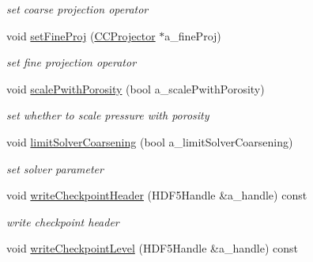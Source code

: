 \begin{DoxyCompactItemize}
\begin{DoxyCompactList}\small\item\em set coarse projection operator \end{DoxyCompactList}\item 
\hypertarget{class_c_c_projector_ab0bbf1c37684fb885be17880899f2a68}{void \hyperlink{class_c_c_projector_ab0bbf1c37684fb885be17880899f2a68}{set\-Fine\-Proj} (\hyperlink{class_c_c_projector}{C\-C\-Projector} $\ast$a\-\_\-fine\-Proj)}\label{class_c_c_projector_ab0bbf1c37684fb885be17880899f2a68}

\begin{DoxyCompactList}\small\item\em set fine projection operator \end{DoxyCompactList}\item 
\hypertarget{class_c_c_projector_ad14f70084789b918a9e4da699e1499db}{void \hyperlink{class_c_c_projector_ad14f70084789b918a9e4da699e1499db}{scale\-Pwith\-Porosity} (bool a\-\_\-scale\-Pwith\-Porosity)}\label{class_c_c_projector_ad14f70084789b918a9e4da699e1499db}

\begin{DoxyCompactList}\small\item\em set whether to scale pressure with porosity \end{DoxyCompactList}\item 
\hypertarget{class_c_c_projector_a7a9dc5baa36fb83923972a952bac556a}{void \hyperlink{class_c_c_projector_a7a9dc5baa36fb83923972a952bac556a}{limit\-Solver\-Coarsening} (bool a\-\_\-limit\-Solver\-Coarsening)}\label{class_c_c_projector_a7a9dc5baa36fb83923972a952bac556a}

\begin{DoxyCompactList}\small\item\em set solver parameter \end{DoxyCompactList}\item 
\hypertarget{class_c_c_projector_a93c4e4df5657e9af48d2613e16fba8d9}{void \hyperlink{class_c_c_projector_a93c4e4df5657e9af48d2613e16fba8d9}{write\-Checkpoint\-Header} (H\-D\-F5\-Handle \&a\-\_\-handle) const }\label{class_c_c_projector_a93c4e4df5657e9af48d2613e16fba8d9}

\begin{DoxyCompactList}\small\item\em write checkpoint header \end{DoxyCompactList}\item 
\hypertarget{class_c_c_projector_a196c1973fa913f9000338652aa746bf3}{void \hyperlink{class_c_c_projector_a196c1973fa913f9000338652aa746bf3}{write\-Checkpoint\-Level} (H\-D\-F5\-Handle \&a\-\_\-handle) const }\label{class_c_c_projector_a196c1973fa913f9000338652aa746bf3}


\end{DoxyCompactItemize}
